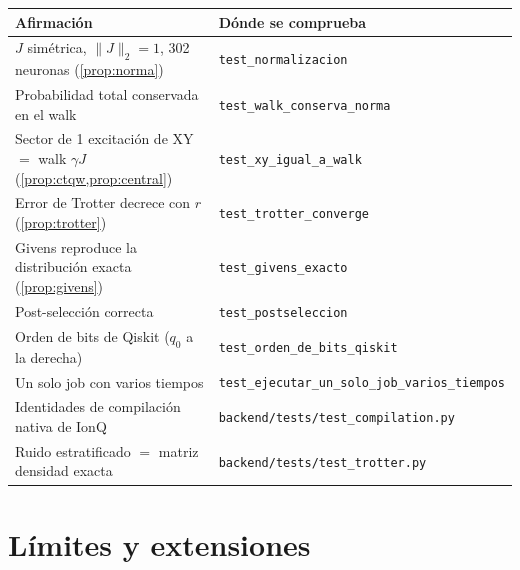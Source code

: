 \documentclass[11pt,a4paper]{article}
\newcommand{\code}[1]{\texttt{#1}}
\theoremstyle{plain}
\theoremstyle{definition}
\theoremstyle{remark}
\begin{document}
\begin{center}
\renewcommand{\arraystretch}{1.15}
\begin{tabular}{@{}L{0.55\textwidth}L{0.38\textwidth}@{}}
\toprule
\textbf{Afirmación} & \textbf{Dónde se comprueba}\\
\midrule
$J$ simétrica, $\lVert J\rVert_2=1$, 302 neuronas (\cref{prop:norma}) & \code{test\_normalizacion}\\
Probabilidad total conservada en el walk & \code{test\_walk\_conserva\_norma}\\
Sector de 1 excitación de XY $=$ walk $\gamma J$ (\cref{prop:ctqw,prop:central}) & \code{test\_xy\_igual\_a\_walk}\\
Error de Trotter decrece con $r$ (\cref{prop:trotter}) & \code{test\_trotter\_converge}\\
Givens reproduce la distribución exacta (\cref{prop:givens}) & \code{test\_givens\_exacto}\\
Post-selección correcta & \code{test\_postseleccion}\\
Orden de bits de Qiskit ($q_0$ a la derecha) & \code{test\_orden\_de\_bits\_qiskit}\\
Un solo job con varios tiempos & \code{test\_ejecutar\_un\_solo\_job\_}\newline\code{varios\_tiempos}\\
Identidades de compilación nativa de IonQ & \code{backend/tests/}\newline\code{test\_compilation.py}\\
Ruido estratificado $=$ matriz densidad exacta & \code{backend/tests/}\newline\code{test\_trotter.py}\\
\bottomrule
\end{tabular}
\end{center}

\section{Límites y extensiones}
\label{sec:extensiones}
\end{document}
